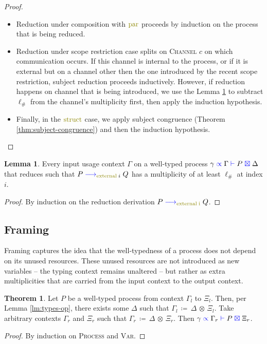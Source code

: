 \documentclass[a4paper,UKenglish,cleveref, autoref, thm-restate,authorcolumns]{lipics-v2019}
\theoremstyle{definition}
\newtheorem{nitheorem}[theorem]{Theorem}
\newtheorem{nilemma}[theorem]{Lemma}
\newcommand{\type}[1]{\textcolor{blue}{\operatorname{#1}}}
\newcommand{\constr}[1]{\textcolor{olive}{\operatorname{#1}}}
\newcommand{\opctx}[3]{#1 \, \coloneqq \, #2 \, \otimes \, #3}
\newcommand{\reduce}[1]{\; \type{\longrightarrow}_{#1} \;}
\newcommand{\types}[4]{#1 \; \type{\propto} \; #2 \; \type{\vdash} \; #3 \; \type{\boxtimes} \; #4}
\begin{document}
\begin{proof}
\begin{itemize}
    \item
    Reduction under composition with $\constr{par}$ proceeds by induction on the process that is being reduced.

    \item
    Reduction under scope restriction case splits on \textsc{Channel} $c$ on which communication occurs.
    If this channel is internal to the process, or if it is external but on a channel other then the one introduced by the recent scope restriction, subject reduction proceeds inductively.
    However, if reduction happens on channel that is being introduced, we use the Lemma \ref{lm:comm-capable} to subtract $\ell_\#$ from the channel's multiplicity first, then apply the induction hypothesis.

    \item
    Finally, in the $\constr{struct}$ case, we apply subject congruence (Theorem \ref{thm:subject-congruence}) and then the induction hypothesis.
  \end{itemize}
\end{proof}

\begin{nilemma}
  \label{lm:comm-capable}
  Every input usage context $\Gamma$ on a well-typed process $\types{\gamma}{\Gamma}{P}{\Delta}$ that reduces such that $P \reduce{\constr{external} \; i} Q$ has a multiplicity of at least $\ell_\#$ at index $i$.
\end{nilemma}
\begin{proof}
  By induction on the reduction derivation $P \reduce{\constr{external \; i}}Q$.
\end{proof}

\subsection{Framing}

Framing captures the idea that the well-typedness of a process does not depend on its unused resources.
These unused resources are not introduced as new variables -- the typing context remains unaltered -- but rather as extra multiplicities that are carried from the input context to the output context.

\begin{nitheorem}
  \label{thm:framing}
  Let $P$ be a well-typed process from context $\Gamma_l$ to $\Xi_l$.
  Then, per Lemma \ref{lm:types-op}, there exists some $\Delta$ such that $\opctx{\Gamma_l}{\Delta}{\Xi_l}$.
  Take arbitrary contexts $\Gamma_r$ and $\Xi_r$ such that $\opctx{\Gamma_r}{\Delta}{\Xi_r}$.
  Then $\types{\gamma}{\Gamma_r}{P}{\Xi_r}$.
\end{nitheorem}
\begin{proof}
  By induction on \textsc{Process} and \textsc{Var}.
\end{proof}
\end{document}
